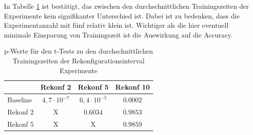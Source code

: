  In Tabelle \ref{tab:reconf} ist bestätigt, das zwischen den durchschnittlichen Trainingszeiten der Experimente kein signifikanter Unterschied ist. Dabei ist zu bedenken, dass die Experimentanzahl mit fünf relativ klein ist. Wichtiger als die hier eventuell minimale Einsparung von Trainingszeit ist die Auswirkung auf die Accuracy.
 


\begin{table}[]
\caption{p-Werte für den t-Tests zu den durchschnittlichen Trainingszeiten der Rekonfigurationsinterval Experimente }
\centering
\begin{tabular}{l|c|c|c|}
\cline{2-4}
                                & \multicolumn{1}{l|}{Rekonf 2}     & \multicolumn{1}{l|}{Rekonf 5}     & \multicolumn{1}{l|}{Rekonf 10}    \\ \hline
\multicolumn{1}{|l|}{Baseline}  & \cellcolor[HTML]{FFFFFF}$4,7\cdot 10^{-7}$ & \cellcolor[HTML]{FFFFFF}$6,4\cdot 10^{-5}$ & \cellcolor[HTML]{FFFFFF}$0.0002$ \\ \hline
\multicolumn{1}{|l|}{Rekonf 2}  & X                                 & \cellcolor[HTML]{FE0000}$0.6034$    & \cellcolor[HTML]{FE0000}$0.9853$    \\ \hline
\multicolumn{1}{|l|}{Rekonf 5}  & X                                 & X                                 & \cellcolor[HTML]{FE0000}$0.9859$    \\ \hline
\end{tabular}
\label{tab:reconf}
\end{table}
 
